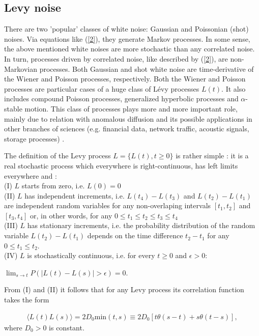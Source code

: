 \documentclass[authoryear,draft,1p,times]{elsarticle}
\newcommand{\bea}{\begin{eqnarray}}
\newcommand{\eea}{\end{eqnarray}}
\renewcommand{\=}{\stackrel{\mathrm{d}}{=}}
\begin{document}

\subsection{Levy noise} 

There are two 'popular' classes of white noise: Gaussian and Poissonian (shot) noises. 
Via equations like (\ref{2}), they generate Markov processes. 
In some sense, the above mentioned white noises are 
 more stochastic than any correlated noise.  
In turn, processes driven by correlated noise,   
like described by (\ref{2}), are non-Markovian processes. 
Both Gaussian and shot white noise are time-derivative of the Wiener  and 
 Poisson processes, respectively. Both the Wiener and Poisson processes are 
particular cases of a huge class of L\'evy processes $L(t)$.  
It also includes compound Poisson processes, generalized hyperbolic processes
and $\alpha$-stable motion.    
This class of processes  
plays more and more important role, mainly due to relation  
with anomalous diffusion and its possible applications in other branches 
of sciences (e.g. financial data, network traffic, acoustic signals, storage processes) .  

The definition of  the Levy process  $L = \{L(t), t\ge 0\}$ is rather simple \cite{levy}: it is a real 
stochastic process which  everywhere is right-continuous,  has left limits everywhere and : \\
(I)  $L$  starts from zero,  i.e. $L(0)=0$   \\
(II)  $L$ has independent  increments, i.e.  $L(t_4) -L(t_3)$ and  $L(t_2) -L(t_1)$ 
are independent random variables for any non-overlaping intervals $[t_1, t_2]$ and $[t_3, t_4]$ or, 
 in other words,  for any  $0 \le t_1 \le t_2 \le t_3 \le t_4$ \\
(III)  $L$ has stationary  increments, i.e.  the probability distribution of the random variable $L(t_2) -L(t_1)$ 
depends on the time difference $t_2 -t_1$ for any $0 \le t_1 \le t_2$. \\
(IV) $L$ is stochastically continuous, i.e. for every $t \ge 0$ and $\epsilon > 0$:  
  \begin{center}
$ \lim_{s\to t} P(|L(t) -L(s)|>\epsilon)=0$. 
\end{center}

From  (I) and (II) it follows \cite{papoulis}  that  for any   Levy process its correlation function takes the form 

%
\bea
\label{Lcorr}
\langle L(t) L(s) \rangle = 2D_0 \mbox{min} (t, s) \equiv 2D_0 [t  \theta(s-t) + s \theta(t-s)], 
\eea
% 
where   $D_0 >0$ is constant. 
\end{document}
